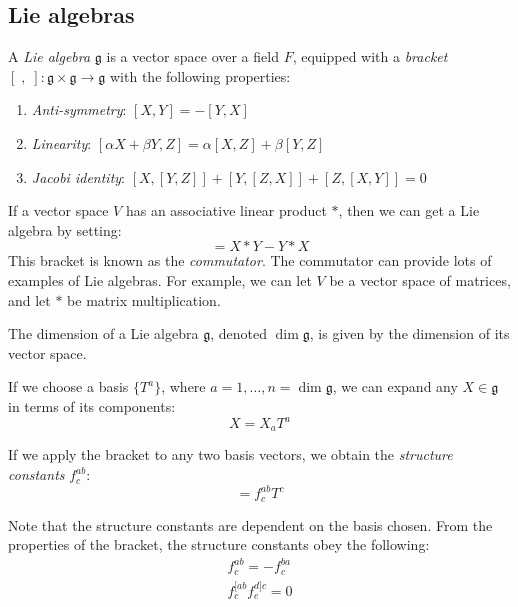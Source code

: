 \documentclass{jknotes}
\begin{document}
\subsection{Lie algebras}
\begin{defn}
    A \emph{Lie algebra} \(\mathfrak{g}\) is a vector space over a field \(F\), equipped with a \emph{bracket} \([\;,\;]:\mathfrak{g}\times\mathfrak{g}\rightarrow\mathfrak{g}\) with the following properties:
    \begin{enumerate}[label=(\roman*)]
        \item \emph{Anti-symmetry}: \([X,Y] = -[Y,X]\)
        \item \emph{Linearity}: \([\alpha X + \beta Y, Z] = \alpha[X,Z] + \beta[Y,Z]\)
        \item \emph{Jacobi identity}: \([X,[Y,Z]] + [Y,[Z,X]] + [Z,[X,Y]] = 0\)
    \end{enumerate}
\end{defn}

\begin{eg}
    If a vector space \(V\) has an associative linear product \(*\), then we can get a Lie algebra by setting:
    \begin{equation}
        [X,Y] = X*Y-Y*X
    \end{equation}
    This bracket is known as the \emph{commutator}. The commutator can provide lots of examples of Lie algebras. For example, we can let \(V\) be a vector space of matrices, and let \(*\) be matrix multiplication.
\end{eg}

The dimension of a Lie algebra \(\mathfrak{g}\), denoted \(\dim \mathfrak{g}\), is given by the dimension of its vector space.

If we choose a basis \(\{T^a\}\), where \(a = 1, \ldots, n = \dim \mathfrak{g}\), we can expand any \(X \in \mathfrak{g}\) in terms of its components:
\begin{equation}
    X = X_aT^a
\end{equation}
\begin{defn}
    If we apply the bracket to any two basis vectors, we obtain the \emph{structure constants} \(f_c^{ab}\):
    \begin{equation}
        [T^a,T^b] = f_c^{ab}T^c
    \end{equation}
\end{defn}
Note that the structure constants are dependent on the basis chosen. From the properties of the bracket, the structure constants obey the following:
\begin{align}
    f_c^{ab} = -f_c^{ba}\\
    f_c^{[ab}f_e^{d]c} = 0
\end{align}
\end{document}
